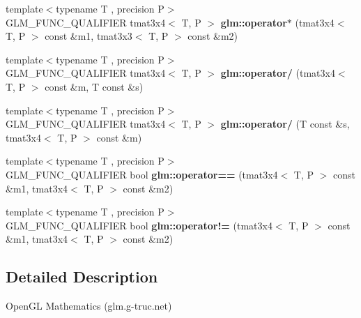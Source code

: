 \begin{DoxyCompactItemize}
\item 
\hypertarget{namespaceglm_a12c934eeec1b9ef7a759ab1941f55038}{{\footnotesize template$<$typename T , precision P$>$ }\\G\-L\-M\-\_\-\-F\-U\-N\-C\-\_\-\-Q\-U\-A\-L\-I\-F\-I\-E\-R tmat3x4$<$ T, P $>$ {\bfseries glm\-::operator$\ast$} (tmat3x4$<$ T, P $>$ const \&m1, tmat3x3$<$ T, P $>$ const \&m2)}\label{namespaceglm_a12c934eeec1b9ef7a759ab1941f55038}

\item 
\hypertarget{namespaceglm_a6e8dc5ca3b17dec86a047d382bc09321}{{\footnotesize template$<$typename T , precision P$>$ }\\G\-L\-M\-\_\-\-F\-U\-N\-C\-\_\-\-Q\-U\-A\-L\-I\-F\-I\-E\-R tmat3x4$<$ T, P $>$ {\bfseries glm\-::operator/} (tmat3x4$<$ T, P $>$ const \&m, T const \&s)}\label{namespaceglm_a6e8dc5ca3b17dec86a047d382bc09321}

\item 
\hypertarget{namespaceglm_a8224db0205ca28349b91c4ce36a29cb8}{{\footnotesize template$<$typename T , precision P$>$ }\\G\-L\-M\-\_\-\-F\-U\-N\-C\-\_\-\-Q\-U\-A\-L\-I\-F\-I\-E\-R tmat3x4$<$ T, P $>$ {\bfseries glm\-::operator/} (T const \&s, tmat3x4$<$ T, P $>$ const \&m)}\label{namespaceglm_a8224db0205ca28349b91c4ce36a29cb8}

\item 
\hypertarget{namespaceglm_a6ce503e89acc786363ee712f65b845d4}{{\footnotesize template$<$typename T , precision P$>$ }\\G\-L\-M\-\_\-\-F\-U\-N\-C\-\_\-\-Q\-U\-A\-L\-I\-F\-I\-E\-R bool {\bfseries glm\-::operator==} (tmat3x4$<$ T, P $>$ const \&m1, tmat3x4$<$ T, P $>$ const \&m2)}\label{namespaceglm_a6ce503e89acc786363ee712f65b845d4}

\item 
\hypertarget{namespaceglm_a39503545e324d1a4846ad10aee597a1e}{{\footnotesize template$<$typename T , precision P$>$ }\\G\-L\-M\-\_\-\-F\-U\-N\-C\-\_\-\-Q\-U\-A\-L\-I\-F\-I\-E\-R bool {\bfseries glm\-::operator!=} (tmat3x4$<$ T, P $>$ const \&m1, tmat3x4$<$ T, P $>$ const \&m2)}\label{namespaceglm_a39503545e324d1a4846ad10aee597a1e}

\end{DoxyCompactItemize}


\subsection{Detailed Description}
Open\-G\-L Mathematics (glm.\-g-\/truc.\-net)

